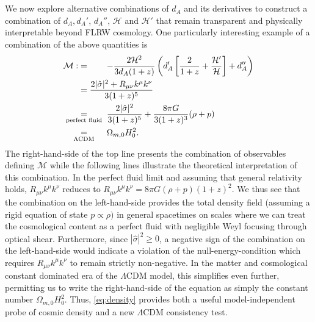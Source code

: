 \documentclass[reprint,aps,prd,nofootinbib,a4paper,10pt,twocolumn,superscriptaddress]{revtex4-2}
\begin{document}
\\\\
We now explore alternative combinations of $d_A$ and its derivatives to construct a combination of $d_A, d_A'$, $d_A''$, $\mathcal{H}$ and $\mathcal{H}'$ that remain transparent and physically interpretable beyond FLRW cosmology. One particularly interesting example of a combination of the above quantities is
\begin{align}\label{eq:density}
\begin{split}
\mathcal{M}:&=\,\,\,\,\,\,\,\,\,\,\,\,-\frac{2\mathcal{H}^2}{3d_A(1+z)}\left(d_A'\left[\frac{2}{1+z}+\frac{\mathcal{H}'}{\mathcal{H}}\right] + d_A''\right)\\&= \frac{2|\hat\sigma|^2+R_{\mu\nu}k^\mu k^\nu}{3(1+z)^5 }\\ &\underset{\mathclap{\text{perfect fluid}}}{=}\,\,\,\,\,\,\,\,\,\,\,\,\frac{2|\hat\sigma|^2}{3(1+z)^5 } + \frac{8\pi G}{3(1+z)^3}(\rho+p)\\ &\underset{\mathclap{\text{$\Lambda$CDM}}}{=} \,\,\,\,\,\,\,\,\,\,\,\,\Omega_{m,0}H_0^2.
\end{split}
\end{align}
The right-hand-side of the top line presents the combination of observables defining $\mathcal{M}$ while the following lines illustrate the theoretical interpretation of this combination. In the perfect fluid limit and assuming that general relativity holds, $R_{\mu\nu}k^\mu k^\nu$ reduces to $R_{\mu\nu}k^\mu k^\nu = 8\pi G(\rho + p)(1+z)^2$.
We thus see that the combination on the left-hand-side provides the total density field (assuming a rigid equation of state $p\propto \rho)$ in general spacetimes on scales where we can treat the cosmological content as a perfect fluid with negligible Weyl focusing through optical shear. Furthermore, since $|\hat\sigma|^2\ge 0$, a negative sign of the combination on the left-hand-side would indicate a violation of the null-energy-condition which requires $R_{\mu\nu}k^\mu k^\nu$ to remain strictly non-negative.
In the matter and cosmological constant dominated era of the $\Lambda$CDM model, this simplifies even further, permitting us to write the right-hand-side of the equation as simply the constant number $\Omega_{m,0}H_0^2$.
Thus, \eqref{eq:density} provides both a useful model-independent probe of cosmic density and a new $\Lambda$CDM consistency test.
\\\\
\end{document}
